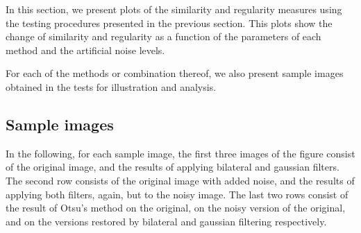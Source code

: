 \newcommand{\plotresults}[2]{
\begin{figure}[H]
   \centering
    \begin{subfigure}[t]{0.44\textwidth}  
       \texttt{[image: img/plots/\#1\_otsu\_sim]}
       \caption{Similarity for thresholding as a function of noise, with bilateral, gaussian and no filtering.}
       \end{subfigure}
       \hspace{0.1cm}
       \begin{subfigure}[t]{0.44\textwidth}
       \texttt{[image: img/plots/\#1\_otsu\_reg]}
       \caption{Regularity for thresholding as a function of noise, with bilateral, gaussian and no filtering.}
       \end{subfigure}
      \\
      \begin{subfigure}[t]{0.44\textwidth}
      \texttt{[image: img/plots/\#1\_filtering\_sim]}
      \caption{Similarity for denoising with bilateral or gaussian filters, as a function of noise.}
      \end{subfigure}
       \hspace{0.1cm}
       \begin{subfigure}[t]{0.44\textwidth}
       \texttt{[image: img/plots/\#1\_filtering\_reg]}
       \caption{Regularity for denoising with bilateral or gaussian filters, as a function of noise.}
       \end{subfigure}
       \caption{Results for file \url{#1}.}
\end{figure}
}

In this section, we present plots of the similarity and regularity measures using the testing procedures presented in the previous section. This plots show the change of similarity and regularity as a function of the parameters of each method and the artificial noise levels.

For each of the methods or combination thereof, we also present sample images obtained in the tests for illustration and analysis.


\subsection{Sample images}

In the following, for each sample image, the first three images of the figure consist of the original image, and the results of applying bilateral and gaussian filters. The second row consists of the original image with added noise, and the results of applying both filters, again, but to the noisy image. The last two rows consist of the result of Otsu's method on the original, on the noisy version of the original, and on the versions restored by bilateral and gaussian filtering respectively.

